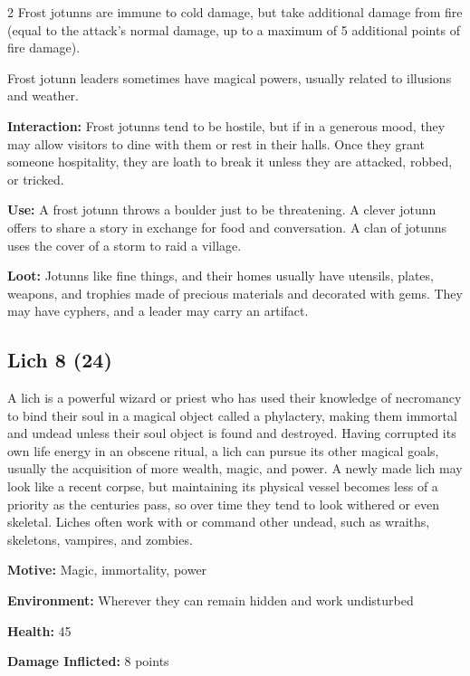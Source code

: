 \begin{multicols}{2}
Frost jotunns are immune to cold damage, but take additional damage from fire (equal to the attack’s normal damage, up to a maximum of 5 additional points of fire damage). 

Frost jotunn leaders sometimes have magical powers, usually related to illusions and weather. 

\textbf{Interaction:} Frost jotunns tend to be hostile, but if in a generous mood, they may allow visitors to dine with them or rest in their halls. Once they grant someone hospitality, they are loath to break it unless they are attacked, robbed, or tricked. 

\textbf{Use:} A frost jotunn throws a boulder just to be threatening. A clever jotunn offers to share a story in exchange for food and conversation. A clan of jotunns uses the cover of a storm to raid a village. 

\textbf{Loot:} Jotunns like fine things, and their homes usually have utensils, plates, weapons, and trophies made of precious materials and decorated with gems. They may have cyphers, and a leader may carry an artifact.

\subsection{Lich 8 (24)}

A lich is a powerful wizard or priest who has used their knowledge of necromancy to bind their soul in a magical object called a phylactery, making them immortal and undead unless their soul object is found and destroyed. Having corrupted its own life energy in an obscene ritual, a lich can pursue its other magical goals, usually the acquisition of more wealth, magic, and power. A newly made lich may look like a recent corpse, but maintaining its physical vessel becomes less of a priority as the centuries pass, so over time they tend to look withered or even skeletal. Liches often work with or command other undead, such as wraiths, skeletons, vampires, and zombies. 

\textbf{Motive:} Magic, immortality, power 

\textbf{Environment:} Wherever they can remain hidden and work undisturbed 

\textbf{Health:} 45 

\textbf{Damage Inflicted:} 8 points 


\end{multicols}
